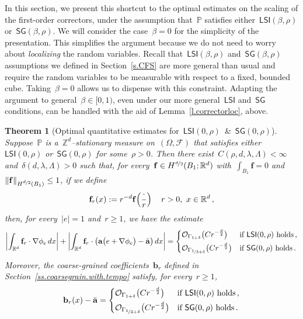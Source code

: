 \documentclass[11pt,twoside]{article} %
\numberwithin{equation}{section}
\newtheorem{theorem}{Theorem}[section]
\theoremstyle{definition}
\let\originalleft\left
\let\originalright\right
\renewcommand{\left}{\mathopen{}\mathclose\bgroup\originalleft}
\renewcommand{\right}{\aftergroup\egroup\originalright}
\newcommand*{\Zd}{\ensuremath{\mathbb{Z}^d}}
\newcommand*{\Rd}{\ensuremath{\mathbb{R}^d}}
\renewcommand{\b}{\ensuremath{\mathbf{b}}}
\newcommand{\f}{\mathbf{f}}
\renewcommand{\a}{\mathbf{a}}
\newcommand{\ahom}{\bar{\a}}
\newcommand{\F}{\mathcal{F}}
\renewcommand{\P}{\mathbb{P}}
\renewcommand{\O}{\mathcal{O}}
\newcommand{\LSI}{\mathsf{LSI}}
\newcommand{\SG}{\mathsf{SG}}
\begin{document}
\smallskip

In this section, we present this shortcut to the optimal estimates on the scaling of the first-order correctors, under the assumption that~$\P$ satisfies either~$\LSI(\beta,\rho)$ or~$\SG(\beta,\rho)$. We will consider the case~$\beta = 0$ for the simplicity of the presentation. This simplifies the argument because we do not need to worry about \emph{localizing} the random variables. Recall that~$\LSI(\beta,\rho)$ and~$\SG(\beta,\rho)$ assumptions we defined in Section~\ref{s.CFS} are more general than usual and require the random variables to be measurable with respect to a fixed, bounded cube. Taking~$\beta = 0$ allows us to dispense with this constraint. Adapting the argument to general~$\beta \in [0,1)$, even under our more general~$\LSI$ and~$\SG$ conditions, can be handled with the aid of Lemma~\ref{l.correctorloc}, above. 

\smallskip


\begin{theorem}[{Optimal quantitative estimates for~$\LSI(0,\rho)$~\&~$\SG(0,\rho)$}]
\label{t.wecan.do.SG.too}
Suppose~$\P$ is a~$\Zd$--stationary measure on~$(\Omega,\F)$ that satisfies either~$\LSI(0,\rho)$ or~$\SG(0,\rho)$ for some~$\rho>0$. 
Then there exist~$C(\rho, d,\lambda,\Lambda)<\infty$ and~$\delta(d,\lambda,\Lambda)>0$ such that, for every~$\f \in H^{\nicefrac d2}(B_1;\Rd)$ with~$\int_{B_1}\f =0$ and~$\| \f \|_{H^{\nicefrac d2}(B_1)} \leq 1$, if we define 
\begin{equation*}
\f_r(x) := r^{-d} \f\Bigl( \frac\cdot r\Bigr)\,\quad r>0,\ x\in\Rd\,,
\end{equation*}
then, for every~$|e|=1$ and~$r\geq 1$, we have the estimate
\begin{equation}
\label{e.cheating}
\biggl| \int_{\Rd} 
\f_r \cdot \nabla \phi_e \,dx\biggr|
+
\biggl| \int_{\Rd} 
\f_r  \cdot \bigl( \a  \bigl( e+ \nabla \phi_e\bigr) - \ahom\bigr) \,dx\biggr|
= 
\left\{
\begin{aligned}
& \O_{\Gamma_{1+\delta}} \bigl(C r^{-\frac d2} \bigr) & \mbox{if} & \ \LSI(0,\rho) \ \mbox{holds}\,, \\
& \O_{\Gamma_{\nicefrac13+\delta}} \bigl(C r^{-\frac d2} \bigr) & \mbox{if} & \ \SG(0,\rho)\ \mbox{holds}\,.
\end{aligned}
\right.
\end{equation}
Moreover, the coarse-grained coefficients~$\b_r$ defined in Section~\ref{ss.coarsegrain.with.tempo} satisfy, for every~$r\geq 1$,
\begin{equation}
\label{e.cheating.CG}
\b_r(x) - \ahom  
= 
\left\{
\begin{aligned}
& \O_{\Gamma_{1+\delta}} \bigl(C r^{-\frac d2} \bigr) & \mbox{if} & \ \LSI(0,\rho) \ \mbox{holds}\,, \\
& \O_{\Gamma_{\nicefrac13+\delta}} \bigl(C r^{-\frac d2} \bigr) & \mbox{if} & \ \SG(0,\rho)\ \mbox{holds}\,.
\end{aligned}
\right.
\end{equation}
\end{theorem}
\end{document}
